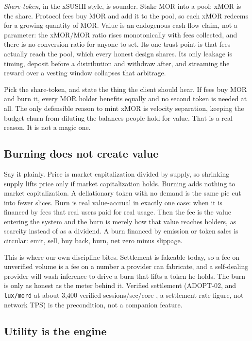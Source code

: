 \documentclass[11pt,a4paper]{article}
\newcommand{\code}[1]{\texttt{\small #1}}
\newcommand{\prov}[1]{{\color{muted}\footnotesize\sffamily[#1]}}
\begin{document}
\textit{Share-token}, in the xSUSHI style, is sounder. Stake MOR into a pool; xMOR is the
share. Protocol fees buy MOR and add it to the pool, so each xMOR redeems for a growing
quantity of MOR. Value is an endogenous cash-flow claim, not a parameter: the xMOR/MOR ratio
rises monotonically with fees collected, and there is no conversion ratio for anyone to set.
Its one trust point is that fees actually reach the pool, which every honest design shares. Its
only leakage is timing, deposit before a distribution and withdraw after, and streaming the
reward over a vesting window collapses that arbitrage.

Pick the share-token, and state the thing the client should hear. If fees buy MOR and burn it,
every MOR holder benefits equally and no second token is needed at all. The only defensible
reason to mint xMOR is velocity separation, keeping the budget churn from diluting the balances
people hold for value. That is a real reason. It is not a magic one.

\subsection{Burning does not create value}

Say it plainly. Price is market capitalization divided by supply, so shrinking supply lifts
price only if market capitalization holds. Burning adds nothing to market capitalization. A
deflationary token with no demand is the same pie cut into fewer slices. Burn is real
value-accrual in exactly one case: when it is financed by fees that real users paid for real
usage. Then the fee is the value entering the system and the burn is merely how that value
reaches holders, as scarcity instead of as a dividend. A burn financed by emission or token
sales is circular: emit, sell, buy back, burn, net zero minus slippage.

This is where our own discipline bites. Settlement is fakeable today, so a fee on unverified
volume is a fee on a number a provider can fabricate, and a self-dealing provider will wash
inference to drive a burn that lifts a token he holds. The burn is only as honest as the meter
behind it. Verified settlement (ADOPT-02, and \code{lux/mord} at about 3,400 verified
sessions/sec/core \prov{verified}, a settlement-rate figure, not network TPS) is the
precondition, not a companion feature.

\subsection{Utility is the engine}
\end{document}

